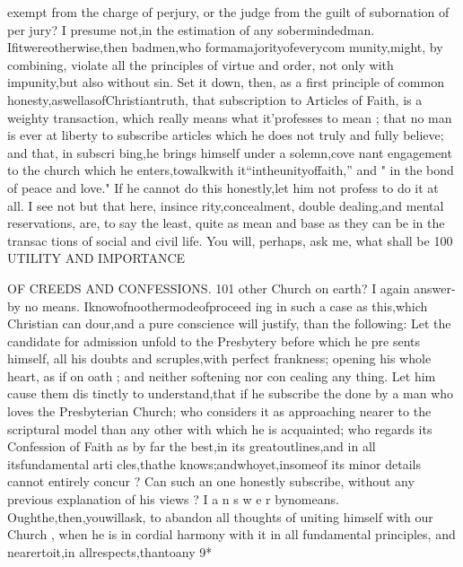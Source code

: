 \documentclass[
]{book}
\begin{document}
exempt from the charge of perjury, or the
judge from the guilt of subornation of per
jury? I presume not,in the estimation of any sobermindedman. Ifitwereotherwise,then
badmen,who formamajorityofeverycom munity,might, by combining, violate all the
principles of virtue and order, not only with impunity,but also without sin.
Set it down, then, as a first principle of common honesty,aswellasofChristiantruth,
that subscription to Articles of Faith, is a
weighty transaction, which really means what
it'professes to mean ; that no man is ever at
liberty to subscribe articles which he does not
truly and fully believe; and that, in subscri
bing,he brings himself under a solemn,cove nant engagement to the church which he
enters,towalkwith it``intheunityoffaith,''
and " in the bond of peace and love." If he cannot do this honestly,let him not profess to do it at all. I see not but that here, insince rity,concealment, double dealing,and mental reservations, are, to say the least, quite as mean and base as they can be in the transac tions of social and civil life.
You will, perhaps, ask me, what shall be
100 UTILITY AND IMPORTANCE

OF CREEDS AND CONFESSIONS. 101
other Church on earth? I again answer- by no means. Iknowofnoothermodeofproceed
ing in such a case as this,which Christian can dour,and a pure conscience will justify, than the following: Let the candidate for admission
unfold to the Presbytery before which he pre sents himself, all his doubts and scruples,with perfect frankness; opening his whole heart, as if on oath ; and neither softening nor con cealing any thing. Let him cause them dis tinctly to understand,that if he subscribe the
done by a man who loves the Presbyterian Church; who considers it as approaching
nearer to the scriptural model than any other with which he is acquainted; who regards its
Confession of Faith as by far the best,in its greatoutlines,and in all itsfundamental arti cles,thathe knows;andwhoyet,insomeof its minor details cannot entirely concur ? Can such an one honestly subscribe, without any previous explanation of his views ? I a n s w e r bynomeans. Oughthe,then,youwillask,
to abandon all thoughts of uniting himself with our Church , when he is in cordial harmony with it in all fundamental principles, and
nearertoit,in allrespects,thantoany
9*
\end{document}
